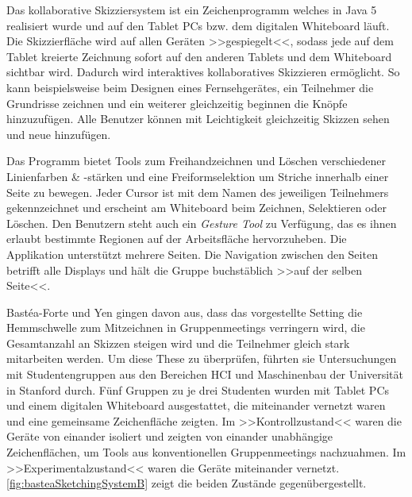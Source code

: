 \medskip Das kollaborative Skizziersystem ist ein Zeichenprogramm welches in Java 5 realisiert wurde und auf den Tablet PCs bzw. dem digitalen Whiteboard läuft. Die Skizzierfläche wird auf allen Geräten >>gespiegelt<<, sodass jede auf dem Tablet kreierte Zeichnung sofort auf den anderen Tablets und dem Whiteboard sichtbar wird. Dadurch wird interaktives kollaboratives Skizzieren ermöglicht. So kann beispielsweise beim Designen eines Fernsehgerätes, ein Teilnehmer die Grundrisse zeichnen und ein weiterer gleichzeitig beginnen die Knöpfe hinzuzufügen. Alle Benutzer können mit Leichtigkeit gleichzeitig Skizzen sehen und neue hinzufügen. 

\medskip Das Programm bietet Tools zum Freihandzeichnen und Löschen verschiedener Linienfarben \& -stärken und eine Freiformselektion um Striche innerhalb einer Seite zu bewegen. Jeder Cursor ist mit dem Namen des jeweiligen Teilnehmers gekennzeichnet und erscheint am Whiteboard beim Zeichnen, Selektieren oder Löschen. Den Benutzern steht auch ein \emph{Gesture Tool} zu Verfügung, das es ihnen erlaubt bestimmte Regionen auf der Arbeitsfläche hervorzuheben. Die Applikation unterstützt mehrere Seiten. Die Navigation zwischen den Seiten betrifft alle Displays und hält die Gruppe buchstäblich >>auf der selben Seite<<.

\medskip Bastéa-Forte und Yen gingen davon aus, dass das vorgestellte Setting die Hemmschwelle zum Mitzeichnen in Gruppenmeetings verringern wird, die Gesamtanzahl an Skizzen steigen wird und die Teilnehmer gleich stark mitarbeiten werden. Um diese These zu überprüfen, führten sie Untersuchungen mit Studentengruppen aus den Bereichen HCI und Maschinenbau der Universität in Stanford durch. Fünf Gruppen zu je drei Studenten wurden mit Tablet PCs und einem digitalen Whiteboard ausgestattet, die miteinander vernetzt waren und eine gemeinsame Zeichenfläche zeigten. Im >>Kontrollzustand<< waren die Geräte von einander isoliert und zeigten von einander unabhängige Zeichenflächen, um Tools aus konventionellen Gruppenmeetings nachzuahmen. Im >>Experimentalzustand<< waren die Geräte miteinander vernetzt. \autoref{fig:basteaSketchingSystemB} zeigt die beiden Zustände gegenübergestellt.

